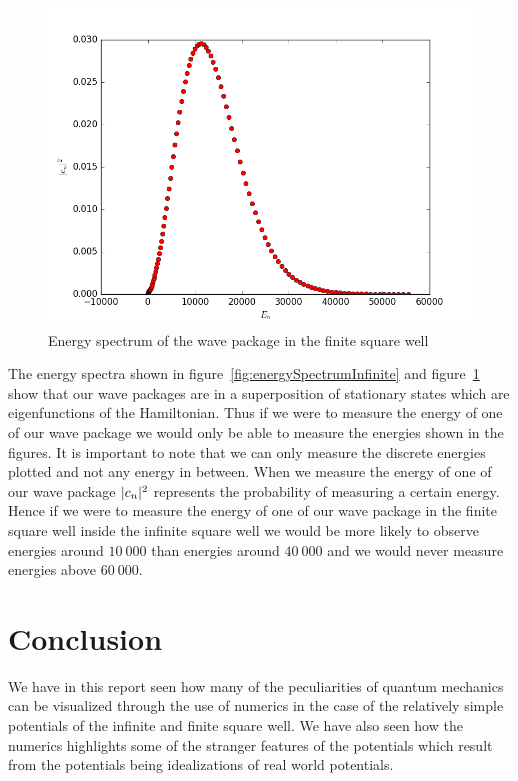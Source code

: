 \documentclass[12pt,a4paper]{article}
\DeclarePairedDelimiter{\abs}{\lvert}{\rvert}
\begin{document}
\begin{figure}
\includegraphics[width=\textwidth]{../Python/WiW_wavePackageEnergySpectrum.png}
\caption{Energy spectrum of the wave package in the finite square well} \label{fig:energySpectrumFinite}
\end{figure}

The energy spectra shown in figure~\ref{fig:energySpectrumInfinite} and figure~\ref{fig:energySpectrumFinite} show that our wave packages are in a superposition of stationary states which are eigenfunctions of the Hamiltonian. Thus if we were to measure the energy of one of our wave package we would only be able to measure the energies shown in the figures. It is important to note that we can only measure the discrete energies plotted and not any energy in between. When we measure the energy of one of our wave package $\abs{c_n}^2$ represents the probability of measuring a certain energy. Hence if we were to measure the energy of one of our wave package in the finite square well inside the infinite square well we would be more likely to observe energies around $10~000$ than energies around $40~000$ and we would never measure energies above $60~000$.

\section{Conclusion}
We have in this report seen how many of the peculiarities of quantum mechanics can be visualized through the use of numerics in the case of the relatively simple potentials of the infinite and finite square well. We have also seen how the numerics highlights some of the stranger features of the potentials which result from the potentials being idealizations of real world potentials.
\end{document}
